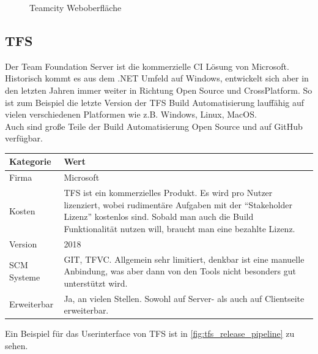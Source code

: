 \begin{figure}[H]
  \centering
  \caption{Teamcity Weboberfläche \cite{TeamCity-Marketing}}\label{fig:TC-continuous-integration}
\end{figure}

\subsection{TFS}
Der Team Foundation Server ist die kommerzielle CI Lösung von Microsoft. Historisch kommt es aus dem .NET Umfeld auf Windows, entwickelt sich aber in den letzten Jahren immer weiter in Richtung Open Source und CrossPlatform. So ist zum Beispiel die letzte Version der TFS Build Automatisierung lauffähig auf vielen verschiedenen Platformen wie z.B. Windows, Linux, MacOS.\\
Auch sind große Teile der Build Automatisierung Open Source und auf GitHub verfügbar.
\begin{center}
  \begin{tabularx}{\textwidth}{lX}
    \toprule
    Kategorie & Wert \\
    \midrule
    Firma &  Microsoft \\
		\addlinespace
    Kosten & TFS ist ein kommerzielles Produkt. Es wird pro Nutzer lizenziert, wobei rudimentäre Aufgaben mit der "`Stakeholder Lizenz"' kostenlos sind. Sobald man auch die Build Funktionalität nutzen will, braucht man eine bezahlte Lizenz.\\
		\addlinespace
		Version & 2018 \\
		\addlinespace
		SCM Systeme & GIT, TFVC. Allgemein sehr limitiert, denkbar ist eine manuelle Anbindung, was aber dann von den Tools nicht besonders gut unterstützt wird.\\
		\addlinespace
		Erweiterbar & Ja, an vielen Stellen. Sowohl auf Server- als auch auf Clientseite erweiterbar.\\
    \bottomrule
  \end{tabularx}
\end{center}
Ein Beispiel für das Userinterface von TFS ist in \autoref{fig:tfs_release_pipeline} zu sehen. 


